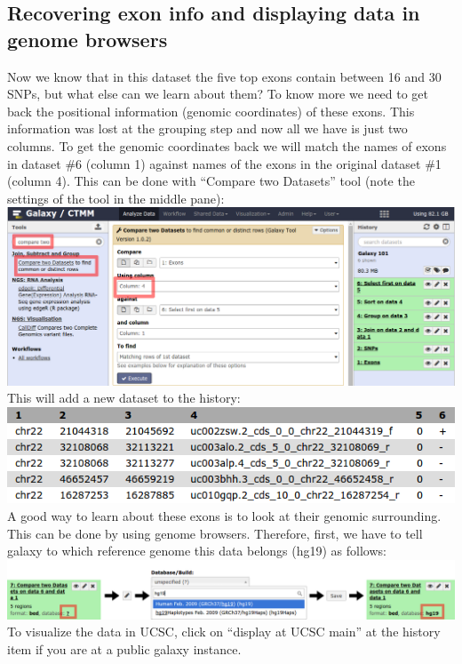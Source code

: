 \documentclass[11pt,a4paper]{article}
\begin{document}
\subsection{ Recovering exon info and displaying data in genome
browsers}
Now we know that in this dataset the five top exons contain between 16 and 30 SNPs, but what else can we learn about them? To know more we need to get back the positional information (genomic coordinates) of these exons.
This information was lost at the grouping step and now all we have is just two columns. To get the genomic coordinates back we will match the names of exons in dataset \#6 (column 1) against names of the exons in the original dataset \#1 (column 4). This can be done with ``Compare two Datasets'' tool (note the settings of the tool in the middle pane):\\
\includegraphics[width=\textwidth]{figures/101_18}\\
This will add a new dataset to the history:\\
\includegraphics[scale=0.65]{figures/101_19}\\
A good way to learn about these exons is to look at their genomic surrounding. This can be done by using genome browsers. 
Therefore, first, we have to tell galaxy to which reference genome this data belongs (hg19) as follows:\\
\includegraphics[width=\textwidth]{figures/101_20}\\
To visualize the data in UCSC, click on ``display at UCSC main'' at the history item if you are at a public galaxy instance.
\end{document}
